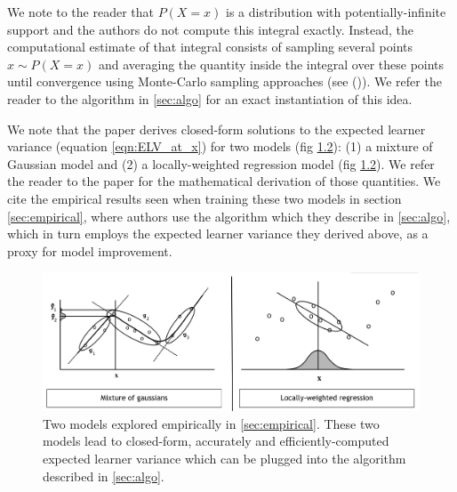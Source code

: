 \documentclass[
  letterpaper,
  DIV=11,
  numbers=noendperiod,
  oneside]{scrreprt}
\theoremstyle{remark}
\begin{document}
We note to the reader that \(P(X=x)\) is a distribution with
potentially-infinite support and the authors do not compute this
integral exactly. Instead, the computational estimate of that integral
consists of sampling several points \(x \sim P(X=x)\) and averaging the
quantity inside the integral over these points until convergence using
Monte-Carlo sampling approaches (see ()). We refer the reader to the algorithm in
\hyperref[sec:algo]{{[}sec:algo{]}} for an exact instantiation of this
idea.

We note that the paper derives closed-form solutions to the expected
learner variance (equation
\hyperref[eqn:ELV_at_x]{{[}eqn:ELV\_at\_x{]}}) for two models (fig
\hyperref[fig:two_models]{1.2}): (1) a mixture of Gaussian model and (2)
a locally-weighted regression model (fig
\hyperref[fig:two_models]{1.2}). We refer the reader to the paper for
the mathematical derivation of those quantities. We cite the empirical
results seen when training these two models in section
\hyperref[sec:empirical]{{[}sec:empirical{]}}, where authors use the
algorithm which they describe in \hyperref[sec:algo]{{[}sec:algo{]}},
which in turn employs the expected learner variance they derived above,
as a proxy for model improvement.

\label{sec:two_models}{}

\begin{figure}

{\centering \includegraphics[width=1\textwidth,height=\textheight]{Figures/1_two_models.png}

}

\caption{Two models explored empirically in
\hyperref[sec:empirical]{{[}sec:empirical{]}}. These two models lead to
closed-form, accurately and efficiently-computed expected learner
variance which can be plugged into the algorithm described in
\hyperref[sec:algo]{{[}sec:algo{]}}.}

\end{figure}%
\end{document}
